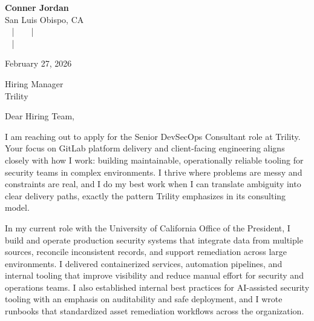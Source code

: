 \documentclass[letterpaper,11pt]{article}
\newcommand{\companyname}{Trility}
\begin{document}
\begin{center}
  {\Huge \textbf{Conner Jordan}}\\[4pt]
  {\Large San Luis Obispo, CA}\\[4pt]
  \href{tel:+18059759793}{
    } ~ | ~
  \href{mailto:connercharlesjordan@gmail.com}{
    } ~ | ~
   \\
  \href{https://www.linkedin.com/in/conner-jordan-4b268514a/}{
    } ~ | ~
  \href{https://github.com/cjordan223}{
    }
\end{center}

\vspace{16pt}

\begin{flushright}
February 27, 2026
\end{flushright}

Hiring Manager\\
\companyname

\vspace{26pt}

\noindent
Dear Hiring Team,

\vspace{16pt}

I am reaching out to apply for the Senior DevSecOps Consultant role at Trility. Your focus on GitLab platform delivery and client-facing engineering aligns closely with how I work: building maintainable, operationally reliable tooling for security teams in complex environments. I thrive where problems are messy and constraints are real, and I do my best work when I can translate ambiguity into clear delivery paths, exactly the pattern Trility emphasizes in its consulting model.

\vspace{16pt}

In my current role with the University of California Office of the President, I build and operate production security systems that integrate data from multiple sources, reconcile inconsistent records, and support remediation across large environments. I delivered containerized services, automation pipelines, and internal tooling that improve visibility and reduce manual effort for security and operations teams. I also established internal best practices for AI-assisted security tooling with an emphasis on auditability and safe deployment, and I wrote runbooks that standardized asset remediation workflows across the organization.
\end{document}
